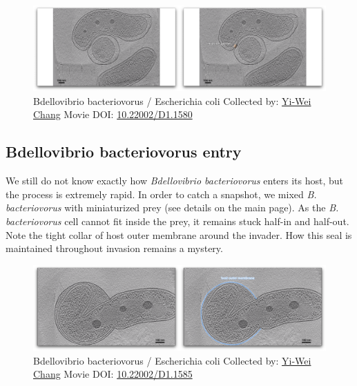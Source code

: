 \documentclass[]{tufte-book}
\begin{document}
\begin{figure}
\includegraphics{movie_stills/9_10} \caption[Bdellovibrio bacteriovorus / Escherichia coli Collected by:
\protect\hyperlink{yi-wei_chang}{Yi-Wei Chang} Movie DOI:
\href{https://doi.org/10.22002/D1.1580}{10.22002/D1.1580}]{Bdellovibrio bacteriovorus / Escherichia coli Collected by:
\protect\hyperlink{yi-wei_chang}{Yi-Wei Chang} Movie DOI:
\href{https://doi.org/10.22002/D1.1580}{10.22002/D1.1580}}\label{fig:9-10}
\end{figure}

\hypertarget{Bdellovibrio_bacteriovorus_entry}{\subsection{Bdellovibrio
bacteriovorus entry}\label{Bdellovibrio_bacteriovorus_entry}}

We still do not know exactly how \emph{Bdellovibrio bacteriovorus}
enters its host, but the process is extremely rapid. In order to catch a
snapshot, we mixed \emph{B. bacteriovorus} with miniaturized prey (see
details on the main page). As the \emph{B. bacteriovorus} cell cannot
fit inside the prey, it remains stuck half-in and half-out. Note the
tight collar of host outer membrane around the invader. How this seal is
maintained throughout invasion remains a mystery.





\begin{figure}
\includegraphics{movie_stills/9_10a} \caption[Bdellovibrio bacteriovorus / Escherichia coli Collected by:
\protect\hyperlink{yi-wei_chang}{Yi-Wei Chang} Movie DOI:
\href{https://doi.org/10.22002/D1.1585}{10.22002/D1.1585}]{Bdellovibrio bacteriovorus / Escherichia coli Collected by:
\protect\hyperlink{yi-wei_chang}{Yi-Wei Chang} Movie DOI:
\href{https://doi.org/10.22002/D1.1585}{10.22002/D1.1585}}\label{fig:9-10a}
\end{figure}
\end{document}
